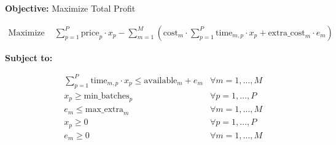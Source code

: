 \documentclass{article}
\begin{document}
\textbf{Objective:} Maximize Total Profit

\begin{align*}
\text{Maximize } & \sum_{p=1}^{P} \text{price}_p \cdot x_p - \sum_{m=1}^{M} \left( \text{cost}_m \cdot \sum_{p=1}^{P} \text{time}_{m,p} \cdot x_p + \text{extra\_cost}_m \cdot e_m \right)
\end{align*}

\textbf{Subject to:}

\begin{align*}
& \sum_{p=1}^{P} \text{time}_{m,p} \cdot x_p \leq \text{available}_m + e_m & \forall m = 1, \ldots, M \\
& x_p \geq \text{min\_batches}_p & \forall p = 1, \ldots, P \\
& e_m \leq \text{max\_extra}_m & \forall m = 1, \ldots, M \\
& x_p \geq 0 & \forall p = 1, \ldots, P \\
& e_m \geq 0 & \forall m = 1, \ldots, M
\end{align*}
\end{document}
